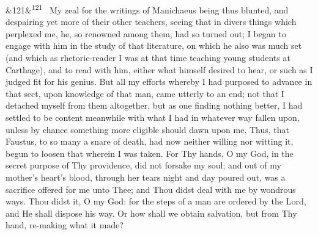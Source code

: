 \documentclass[12pt]{article}
\newcommand{\para}[1][]{\par\noindent\ifx&#1&\else\textsuperscript{\footnotesize #1}~\fi}
\begin{document}
\para[121] My zeal for the writings of Manichaeus being thus blunted, and despairing yet more of their other teachers, seeing that in divers things which perplexed me, he, so renowned among them, had so turned out; I began to engage with him in the study of that literature, on which he also was much set (and which as rhetoric-reader I was at that time teaching young students at Carthage), and to read with him, either what himself desired to hear, or such as I judged fit for his genius. But all my efforts whereby I had purposed to advance in that sect, upon knowledge of that man, came utterly to an end; not that I detached myself from them altogether, but as one finding nothing better, I had settled to be content meanwhile with what I had in whatever way fallen upon, unless by chance something more eligible should dawn upon me. Thus, that Faustus, to so many a snare of death, had now neither willing nor witting it, begun to loosen that wherein I was taken. For Thy hands, O my God, in the secret purpose of Thy providence, did not forsake my soul; and out of my mother's heart's blood, through her tears night and day poured out, was a sacrifice offered for me unto Thee; and Thou didst deal with me by wondrous ways. Thou didst it, O my God: for the steps of a man are ordered by the Lord, and He shall dispose his way. Or how shall we obtain salvation, but from Thy hand, re-making what it made?
\end{document}
